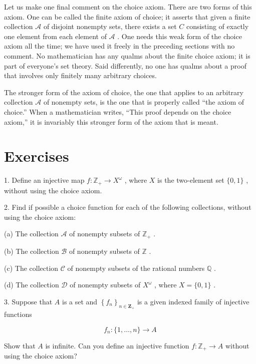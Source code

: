 Let us make one final comment on the choice axiom. There are two forms of this axiom. One can be called the finite axiom of choice; it asserts that given a finite collection \(\mathcal{A}\) of disjoint nonempty sets, there exists a set \(C\) consisting of exactly one element from each element of \(\mathcal{A}\) . One needs this weak form of the choice axiom all the time; we have used it freely in the preceding sections with no comment. No mathematician has any qualms about the finite choice axiom; it is part of everyone's set theory. Said differently, no one has qualms about a proof that involves only finitely many arbitrary choices.

The stronger form of the axiom of choice, the one that applies to an arbitrary collection \(\mathcal{A}\) of nonempty sets, is the one that is properly called ``the axiom of choice.'' When a mathematician writes, ``This proof depends on the choice axiom,'' it is invariably this stronger form of the axiom that is meant.

\section*{Exercises}

1. Define an injective map \(f : {\mathbb{Z}}_{ + } \rightarrow  {X}^{\omega }\) , where \(X\) is the two-element set \(\{ 0,1\}\) , without using the choice axiom.

2. Find if possible a choice function for each of the following collections, without using the choice axiom:

(a) The collection \(\mathcal{A}\) of nonempty subsets of \({\mathbb{Z}}_{ + }\) .

(b) The collection \(\mathcal{B}\) of nonempty subsets of \(\mathbb{Z}\) .

(c) The collection \(\mathcal{C}\) of nonempty subsets of the rational numbers \(\mathbb{Q}\) .

(d) The collection \(\mathcal{D}\) of nonempty subsets of \({X}^{\omega }\) , where \(X = \{ 0,1\}\) .

3. Suppose that \(A\) is a set and \({\left\{  {f}_{n}\right\}  }_{n \in  {\mathbf{Z}}_{ + }}\) is a given indexed family of injective functions

\[
{f}_{n} : \{ 1,\ldots ,n\}  \rightarrow  A
\]

Show that \(A\) is infinite. Can you define an injective function \(f : {\mathbb{Z}}_{ + } \rightarrow  A\) without using the choice axiom?

